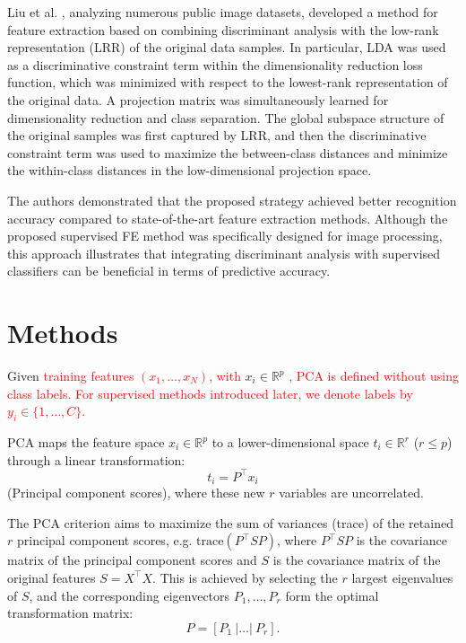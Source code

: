 \documentclass[11pt,a4paper]{article}
\providecommand{\DIFaddtex}[1]{\textcolor{red}{#1}} %
\providecommand{\DIFaddbegin}{} %
\providecommand{\DIFaddend}{} %
\providecommand{\DIFadd}[1]{\texorpdfstring{\DIFaddtex{#1}}{#1}} %
\begin{document}
Liu et al. \citep{liu2019discriminative}, analyzing numerous public image datasets, developed a method for feature extraction based on combining discriminant analysis with the low-rank representation (LRR) of the original data samples.  
In particular, LDA was used as a discriminative constraint term within the dimensionality reduction loss function, which was minimized with respect to the lowest-rank representation of the original data.  
A projection matrix was simultaneously learned for dimensionality reduction and class separation.  
The global subspace structure of the original samples was first captured by LRR, and then the discriminative constraint term was used to maximize the between-class distances and minimize the within-class distances in the low-dimensional projection space.

The authors demonstrated that the proposed strategy achieved better recognition accuracy compared to state-of-the-art feature extraction methods.  
Although the proposed supervised FE method was specifically designed for image processing, this approach illustrates that integrating discriminant analysis with supervised classifiers can be beneficial in terms of predictive accuracy.



\section{Methods}


Given  \DIFaddbegin \DIFadd{training features $(x_1, \dots, x_N)$, with }\DIFaddend $x_i \in \mathbb{R}^p$ \DIFaddbegin \DIFadd{, PCA is defined without using class labels. For supervised methods introduced later, we denote labels by $y_i \in \{1,\dots,C\}$.  
}\DIFaddend 

PCA maps the feature space $x_i \in \mathbb{R}^p$ to a lower-dimensional space $t_i \in \mathbb{R}^r$ ($r \leq p$) through a linear transformation:
\[
t_i = P^\top x_i
\]
(Principal component scores), where these new $r$ variables are uncorrelated.

The PCA criterion aims to maximize the sum of variances (trace) of the retained $r$ principal component scores, e.g. $\text{trace}(P^\top S P)$, where $P^\top S P$ is the covariance matrix of the principal component scores and $S$ is the covariance matrix of the original features $S = X^\top X$.  
This is achieved by selecting the $r$ largest eigenvalues of $S$, and the corresponding eigenvectors $P_1, \dots, P_r$ form the optimal transformation matrix:
\[
P = [P_1 \ | \dots | \ P_r].
\]
\end{document}
